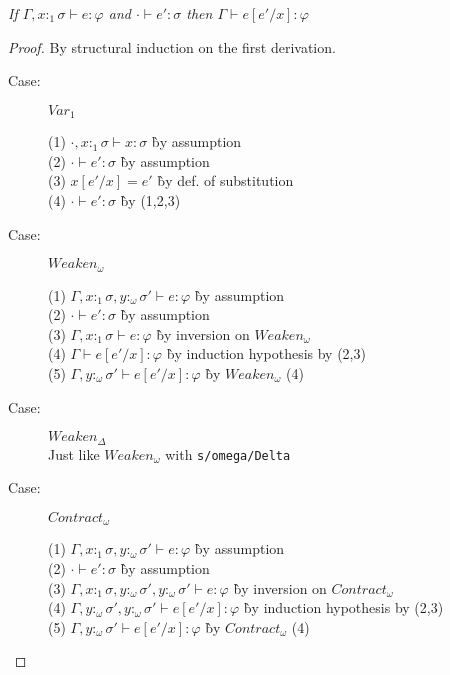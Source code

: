 \begin{lemma}
\emph{If $\Gamma, x{:}_1\sigma \vdash e : \varphi$ and $\cdot \vdash e' : \sigma$ then $\Gamma \vdash e[e'/x] : \varphi$}
\end{lemma}

\begin{proof}
By structural induction on the first derivation.

\begin{description}

\item[Case:] $Var_1$
\begin{tabbing}
  (1) $\cdot,x{:}_1\sigma \vdash x : \sigma$ \` by assumption\\
  (2) $\cdot \vdash e' : \sigma$ \` by assumption\\
  (3) $x[e'/x] = e'$ \` by def. of substitution\\
  (4) $\cdot \vdash e' : \sigma$ \` by (1,2,3)\\
\end{tabbing}

\item[Case:] $Weaken_\omega$
\begin{tabbing}
  (1) $\Gamma, x{:}_1\sigma, y{:}_\omega\sigma' \vdash e : \varphi$ \` by assumption\\
  (2) $\cdot \vdash e' : \sigma$ \` by assumption\\
  (3) $\Gamma, x{:}_1\sigma \vdash e : \varphi$ \` by inversion on $Weaken_\omega$\\
  (4) $\Gamma \vdash e[e'/x] : \varphi$ \` by induction hypothesis by (2,3)\\
  (5) $\Gamma, y{:}_\omega\sigma' \vdash e[e'/x] : \varphi$ \` by $Weaken_\omega$ (4)\\
\end{tabbing}

\item[Case:] $Weaken_\Delta$\\
Just like $Weaken_\omega$ with \texttt{s/omega/Delta}

\item[Case:] $Contract_\omega$
\begin{tabbing}
  (1) $\Gamma, x{:}_1\sigma, y{:}_\omega\sigma' \vdash e : \varphi$ \` by assumption\\
  (2) $\cdot \vdash e' : \sigma$ \` by assumption\\
  (3) $\Gamma, x{:}_1\sigma, y{:}_\omega\sigma', y{:}_\omega\sigma' \vdash e : \varphi$ \` by inversion on $Contract_\omega$\\
  (4) $\Gamma, y{:}_\omega\sigma', y{:}_\omega\sigma' \vdash e[e'/x] : \varphi$ \` by induction hypothesis by (2,3)\\
  (5) $\Gamma, y{:}_\omega\sigma' \vdash e[e'/x] : \varphi$ \` by $Contract_\omega$ (4)\\
\end{tabbing}


\end{description}
\end{proof}
